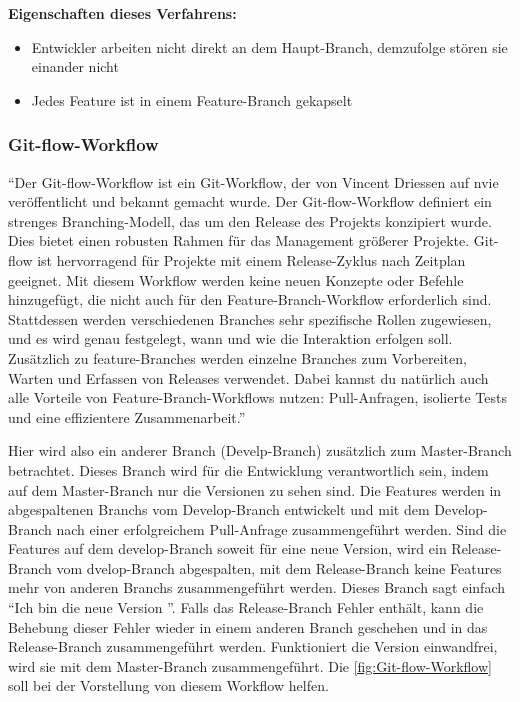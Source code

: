 \textbf{Eigenschaften dieses Verfahrens:}
\begin{itemize}
	\item Entwickler arbeiten nicht direkt an dem Haupt-Branch, demzufolge stören sie einander nicht
	\item Jedes Feature ist in einem Feature-Branch gekapselt
\end{itemize}

\subsubsection{Git-flow-Workflow}
\label{subsubsec:Git-flow-Workflow}

"`Der Git-flow-Workflow ist ein Git-Workflow, der von Vincent Driessen auf nvie veröffentlicht und bekannt gemacht wurde. Der Git-flow-Workflow definiert ein strenges Branching-Modell, das um den Release des Projekts konzipiert wurde. Dies bietet einen robusten Rahmen für das Management größerer Projekte.
Git-flow ist hervorragend für Projekte mit einem Release-Zyklus nach Zeitplan geeignet. Mit diesem Workflow werden keine neuen Konzepte oder Befehle hinzugefügt, die nicht auch für 		den Feature-Branch-Workflow erforderlich sind. Stattdessen werden verschiedenen Branches sehr spezifische Rollen zugewiesen, und es wird genau festgelegt, wann und wie die 				Interaktion erfolgen soll. Zusätzlich zu feature-Branches werden einzelne Branches zum Vorbereiten, Warten und Erfassen von Releases verwendet. Dabei kannst du natürlich auch alle 		Vorteile von Feature-Branch-Workflows nutzen: Pull-Anfragen, isolierte Tests und eine effizientere Zusammenarbeit."' \cite{Git-flow-Workflow}

Hier wird also ein anderer Branch (Develp-Branch) zusätzlich zum Master-Branch betrachtet. Dieses Branch wird für die Entwicklung verantwortlich sein, indem auf dem Master-Branch 			nur die Versionen zu sehen sind. Die Features werden in abgespaltenen Branchs vom Develop-Branch entwickelt und mit dem Develop-Branch nach einer erfolgreichem Pull-Anfrage 				zusammengeführt werden. Sind die Features auf dem develop-Branch soweit für eine neue Version, wird ein Release-Branch vom dvelop-Branch abgespalten, mit dem Release-Branch keine 			Features mehr von anderen Branchs zusammengeführt werden. Dieses Branch sagt einfach "`Ich bin die neue Version "'. Falls das Release-Branch Fehler enthält, kann die Behebung dieser			Fehler wieder in einem anderen Branch geschehen und in das Release-Branch zusammengeführt werden. Funktioniert die Version einwandfrei, wird sie mit dem Master-Branch 						zusammengeführt. Die \cref{fig:Git-flow-Workflow} soll bei der Vorstellung von diesem Workflow helfen.

